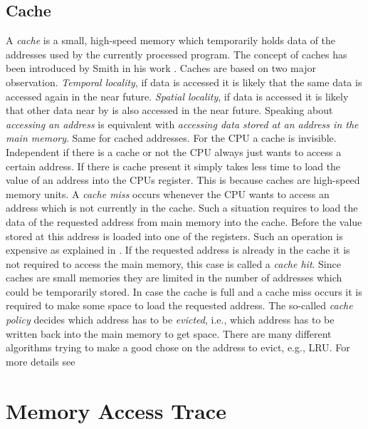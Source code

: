 \documentclass[onecolumn, openright, master, english, signatures]{dbrgrptt}
\begin{document}
\subsection{Cache}
A \emph{cache} is a small, high-speed memory which temporarily holds data of the addresses used by the currently processed program. The concept of caches has been introduced by Smith in his work \cite{smith1982cache}.
Caches are based on two major observation. \emph{Temporal locality}, if data is accessed it is likely that the same data is accessed again in the near future. \emph{Spatial locality}, if data is accessed it is likely that other data near by is also accessed in the near future. Speaking about \emph{accessing an address} is equivalent with \emph{accessing data stored at an address in the main memory}. Same for cached addresses.
For the \ac{CPU} a cache is invisible. Independent if there is a cache or not the \ac{CPU} always just wants to access a certain address. If there is cache present it simply takes less time to load the value of an address into the \ac{CPU}s register. This is because caches are high-speed memory units.
A \emph{cache miss} occurs whenever the CPU wants to access an address which is not currently in the cache. Such a situation requires to load the data of the requested address from main memory into the cache. Before the value stored at this address is loaded into one of the registers. Such an operation is expensive as explained in . If the requested address is already in the cache it is not required to access the main memory, this case is called a \emph{cache hit}. Since caches are small memories they are limited in the number of addresses which could be temporarily stored. In case the cache is full and a cache miss occurs it is required to make some space to load the requested address. The so-called \emph{cache policy} decides which address has to be \emph{evicted}, i.e., which address has to be written back into the main memory to get space. There are many different algorithms trying to make a good chose on the address to evict, e.g., \ac{LRU}. For more details see 


\section{Memory Access Trace}\label{sec:memory-access-trace}
\end{document}
